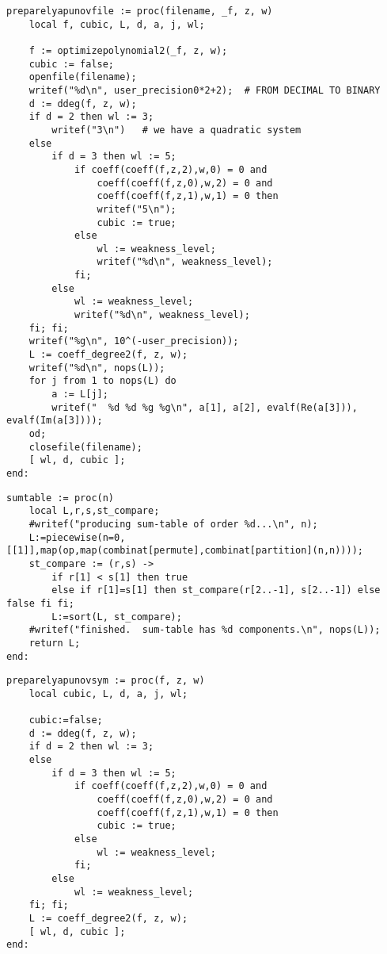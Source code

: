 \documentclass[a4paper,10pt]{article}
\begin{document}
\begin{lstlisting}[name=weakfocus]
preparelyapunovfile := proc(filename, _f, z, w)
    local f, cubic, L, d, a, j, wl;

    f := optimizepolynomial2(_f, z, w);
    cubic := false;
    openfile(filename);
    writef("%d\n", user_precision0*2+2);  # FROM DECIMAL TO BINARY
    d := ddeg(f, z, w);
    if d = 2 then wl := 3;
        writef("3\n")   # we have a quadratic system
    else
        if d = 3 then wl := 5;
            if coeff(coeff(f,z,2),w,0) = 0 and
                coeff(coeff(f,z,0),w,2) = 0 and
                coeff(coeff(f,z,1),w,1) = 0 then
                writef("5\n");
                cubic := true;
            else
                wl := weakness_level;
                writef("%d\n", weakness_level);
            fi;
        else
            wl := weakness_level;
            writef("%d\n", weakness_level);
    fi; fi;
    writef("%g\n", 10^(-user_precision));
    L := coeff_degree2(f, z, w);
    writef("%d\n", nops(L));
    for j from 1 to nops(L) do
        a := L[j];
        writef("  %d %d %g %g\n", a[1], a[2], evalf(Re(a[3])), evalf(Im(a[3])));
    od;
    closefile(filename);
    [ wl, d, cubic ];
end:
\end{lstlisting}

\begin{lstlisting}[name=weakfocus]
sumtable := proc(n)
    local L,r,s,st_compare;
    #writef("producing sum-table of order %d...\n", n);
    L:=piecewise(n=0,[[1]],map(op,map(combinat[permute],combinat[partition](n,n))));
    st_compare := (r,s) ->
        if r[1] < s[1] then true
        else if r[1]=s[1] then st_compare(r[2..-1], s[2..-1]) else false fi fi;
        L:=sort(L, st_compare);
    #writef("finished.  sum-table has %d components.\n", nops(L));
    return L;
end:
\end{lstlisting}

\begin{lstlisting}
preparelyapunovsym := proc(f, z, w)
    local cubic, L, d, a, j, wl;

    cubic:=false;
    d := ddeg(f, z, w);
    if d = 2 then wl := 3;
    else
        if d = 3 then wl := 5;
            if coeff(coeff(f,z,2),w,0) = 0 and
                coeff(coeff(f,z,0),w,2) = 0 and
                coeff(coeff(f,z,1),w,1) = 0 then
                cubic := true;
            else
                wl := weakness_level;
            fi;
        else
            wl := weakness_level;
    fi; fi;
    L := coeff_degree2(f, z, w);
    [ wl, d, cubic ];
end:
\end{lstlisting}
\end{document}
